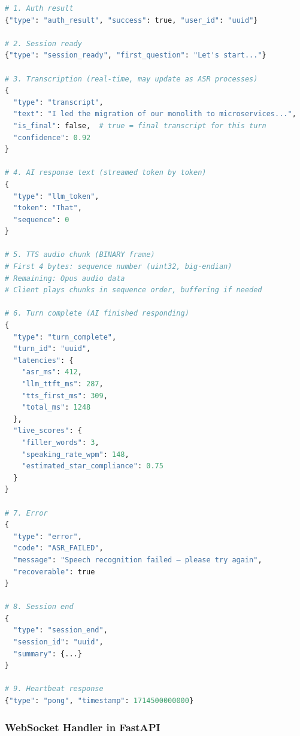 \documentclass[
  11pt,
]{article}
\begin{document}
\begin{lstlisting}[language=Python]
# 1. Auth result
{"type": "auth_result", "success": true, "user_id": "uuid"}

# 2. Session ready
{"type": "session_ready", "first_question": "Let's start..."}

# 3. Transcription (real-time, may update as ASR processes)
{
  "type": "transcript",
  "text": "I led the migration of our monolith to microservices...",
  "is_final": false,  # true = final transcript for this turn
  "confidence": 0.92
}

# 4. AI response text (streamed token by token)
{
  "type": "llm_token",
  "token": "That",
  "sequence": 0
}

# 5. TTS audio chunk (BINARY frame)
# First 4 bytes: sequence number (uint32, big-endian)
# Remaining: Opus audio data
# Client plays chunks in sequence order, buffering if needed

# 6. Turn complete (AI finished responding)
{
  "type": "turn_complete",
  "turn_id": "uuid",
  "latencies": {
    "asr_ms": 412,
    "llm_ttft_ms": 287,
    "tts_first_ms": 309,
    "total_ms": 1248
  },
  "live_scores": {
    "filler_words": 3,
    "speaking_rate_wpm": 148,
    "estimated_star_compliance": 0.75
  }
}

# 7. Error
{
  "type": "error",
  "code": "ASR_FAILED",
  "message": "Speech recognition failed — please try again",
  "recoverable": true
}

# 8. Session end
{
  "type": "session_end",
  "session_id": "uuid",
  "summary": {...}
}

# 9. Heartbeat response
{"type": "pong", "timestamp": 1714500000000}
\end{lstlisting}

\hypertarget{websocket-handler-in-fastapi}{%
\subsubsection{WebSocket Handler in
FastAPI}\label{websocket-handler-in-fastapi}}
\end{document}
